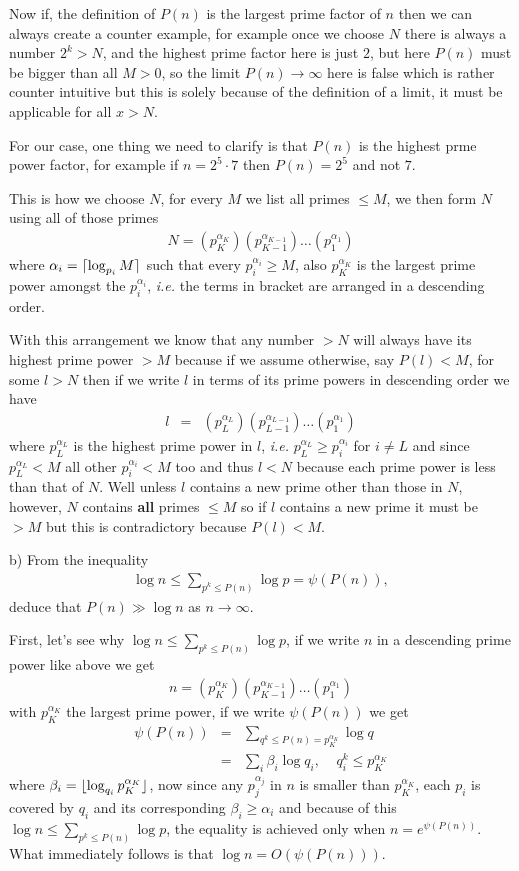 \documentclass[aps,preprint,preprintnumbers,nofootinbib,showpacs,prd]{revtex4-1}
\newcommand{\ie}{{\it i.e.} }
\newcommand{\nbea}{\begin{eqnarray*}}
\newcommand{\neea}{\end{eqnarray*}}
\DeclarePairedDelimiter{\ceil}{\lceil}{\rceil}
\DeclarePairedDelimiter{\floor}{\lfloor}{\rfloor}
\begin{document}
Now if, the definition of $P(n)$ is the largest prime factor of $n$ then we can always create a counter example, for example once we choose $N$ there is always a number $2^k > N$, and the highest prime factor here is just $2$, but here $P(n)$ must be bigger than all $M > 0$, so the limit $P(n) \to \infty$ here is false which is rather counter intuitive but this is solely because of the definition of a limit, it must be applicable for all $x > N$.

For our case, one thing we need to clarify is that $P(n)$ is the highest prme power factor, for example if $n = 2^5\cdot 7$ then $P(n) = 2^5$ and not $7$.

This is how we choose $N$, for every $M$ we list all primes $\le M$, we then form $N$ using all of those primes
%
\nbea
N = (p_K^{\alpha_K})(p_{K-1}^{\alpha_{K-1}}) \dots (p_1^{\alpha_1})
\neea
%
where $\alpha_i = \ceil{\log_{p_i} M}$ such that every $p_i^{\alpha_i} \ge M$, also $p_K^{\alpha_K}$ is the largest prime power amongst the $p_i^{\alpha_i}$, \ie the terms in bracket are arranged in a descending order.

With this arrangement we know that any number $> N$ will always have its highest prime power $> M$ because if we assume otherwise, say $P(l) < M$, for some $l > N$ then if we write $l$ in terms of its prime powers in descending order we have
%
\nbea
l & = & (p_L^{\alpha_L})(p_{L-1}^{\alpha_{L-1}}) \dots (p_1^{\alpha_1})
\neea
%
where $p_L^{\alpha_L}$ is the highest prime power in $l$, \ie $p_L^{\alpha_L} \ge p_i^{\alpha_i}$ for $i \neq L$ and since $p_L^{\alpha_L} < M$ all other $p_i^{\alpha_i} < M$ too and thus $l < N$ because each prime power is less than that of $N$. Well unless $l$ contains a new prime other than those in $N$, however, $N$ contains {\bf all} primes $\le M$ so if $l$ contains a new prime it must be $> M$ but this is contradictory because $P(l) < M$.

b) From the inequality
%
\nbea
\log n \le \sum_{p^k \le P(n)} \log p = \psi(P (n)),
\neea
%
deduce that $P(n) \gg \log n$ as $n \to \infty$.

First, let's see why $\log n \le \sum_{p^k \le P(n)} \log p$, if we write $n$ in a descending prime power like above we get
%
\nbea
n =  (p_K^{\alpha_K})(p_{K-1}^{\alpha_{K-1}}) \dots (p_1^{\alpha_1})
\neea
%
with $p_K^{\alpha_K}$ the largest prime power, if we write $\psi(P (n))$ we get
%
\nbea
\psi(P (n)) & = & \sum_{q^k \le P(n) = p_K^{\alpha_K}} \log q \\
& = & \sum_{i}\beta_i \log q_i, ~~~~~ q_i^k \le p_K^{\alpha_K}
\neea
%
where $\beta_i = \floor{\log_{q_i} p_K^{\alpha_K}}$, now since any $p_j^{\alpha_j}$ in $n$ is smaller than $p_K^{\alpha_K}$, each $p_i$ is covered by $q_i$ and its corresponding $\beta_i \ge \alpha_i$ and because of this $\log n \le \sum_{p^k \le P(n)} \log p$, the equality is achieved only when $n = e^{\psi(P(n))}$. What immediately follows is that $\log n = O(\psi(P(n)))$.
\end{document}
